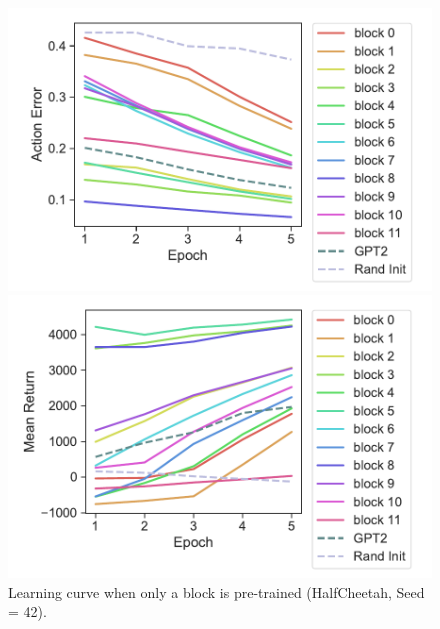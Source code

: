 \documentclass{article}
\begin{document}
\begin{figure}[H]
    \centering
    \begin{minipage}[b]{0.48\linewidth}
        \includegraphics[width=\linewidth]{figs/actionerror_block_gpt2_dt_K1_halfcheetah_medium_42.pdf}
    \end{minipage}
    \begin{minipage}[b]{0.48\linewidth}
        \includegraphics[width=\linewidth]{figs/returnmean_block_gpt2_dt_K1_halfcheetah_medium_42.pdf}
    \end{minipage}
    \caption{Learning curve when only a block is pre-trained (HalfCheetah, Seed = 42).}
    \label{fig:learning_curve_halfcheetah_42}
\end{figure}
\end{document}
